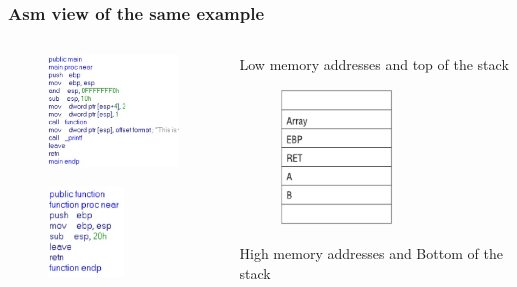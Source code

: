 \documentclass[]{beamer}
\begin{document}
\begin{frame}
  \frametitle{Asm view of the same example}
  \begin{columns}
    \begin{column}{2.5in}
      \hspace*{1cm}
      \begin{figure}\flushleft
        \includegraphics[width=4cm]{images/ida_main.eps}
      \end{figure}
      \hspace*{1cm}
      \begin{figure}\flushleft
        \includegraphics[width=2cm]{images/ida_function.eps}
      \end{figure}

    \end{column}
    \begin{column}{2.5in}
      \vspace{0.7cm}
      {\centering\tiny Low memory addresses and top of the stack \par}
      \begin{figure}
        \includegraphics[width=3cm]{images/stack_after_call.eps}

      \end{figure}
      {\centering\tiny High memory addresses and Bottom of the stack\par}
    \end{column}
  \end{columns}
  \begin{figure}
  \end{figure}

\end{frame}
\end{document}
